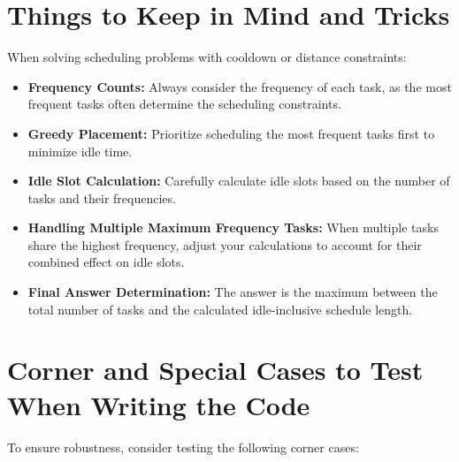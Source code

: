 \section*{Things to Keep in Mind and Tricks}

When solving scheduling problems with cooldown or distance constraints:

\begin{itemize}
    \item \textbf{Frequency Counts:} Always consider the frequency of each task, as the most frequent tasks often determine the scheduling constraints.
    
    \item \textbf{Greedy Placement:} Prioritize scheduling the most frequent tasks first to minimize idle time.
    
    \item \textbf{Idle Slot Calculation:} Carefully calculate idle slots based on the number of tasks and their frequencies.
    
    \item \textbf{Handling Multiple Maximum Frequency Tasks:} When multiple tasks share the highest frequency, adjust your calculations to account for their combined effect on idle slots.
    
    \item \textbf{Final Answer Determination:} The answer is the maximum between the total number of tasks and the calculated idle-inclusive schedule length.
\end{itemize}

\section*{Corner and Special Cases to Test When Writing the Code}

To ensure robustness, consider testing the following corner cases:

